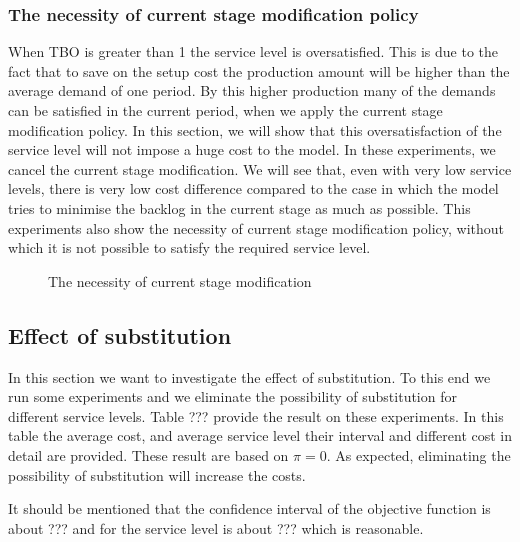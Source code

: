 \documentclass[10pt]{article}
\begin{document}
\subsubsection{The necessity of current stage modification policy}
    When TBO is greater than 1 the service level is oversatisfied. This is due to the fact that to save on the setup cost the production amount will be higher than the average demand of one period. By this higher production many of the demands can be satisfied in the current period, when we apply the current stage modification policy. In this section, we will show that this oversatisfaction of the service level will not impose a huge cost to the model. In these experiments, we cancel the current stage modification. We will see that, even with very low service levels, there is very low cost difference compared to the case in which the model tries to minimise the backlog in the current stage as much as possible. This experiments also show the necessity of current stage modification policy, without which it is not possible to satisfy the required service level.
    
    
\begin{figure} [H]
    \centering
    \caption{The necessity of current stage modification}%
    \label{fig:TBOComp}%
\end{figure}




\subsection{Effect of substitution}

In this section we want to investigate the effect of substitution. To this end we run some experiments and we eliminate the possibility of substitution for different service levels. Table ??? provide the result on these experiments. In this table the average cost, and average service level their interval and different cost in detail are provided. These result are based on $\pi =0$. As expected, eliminating the possibility of substitution will increase the costs. 

It should be mentioned that the confidence interval of the objective function is about ??? and for the service level is about ??? which is reasonable.
\end{document}
